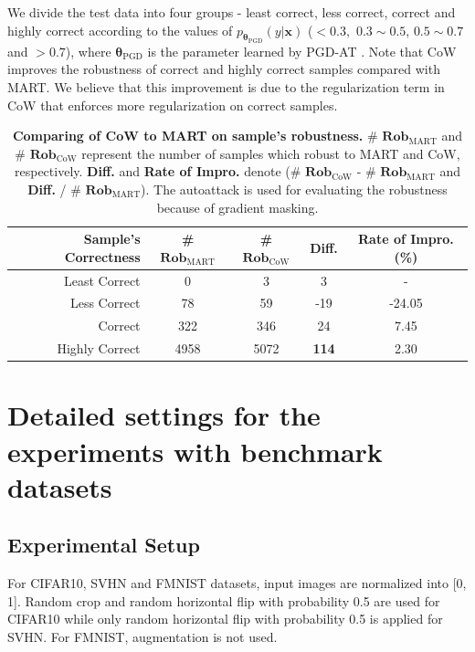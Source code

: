 \documentclass[nohyperref]{article}
\theoremstyle{plain}
\theoremstyle{definition}
\theoremstyle{remark}
\begin{document}
We divide the test data into four groups - least correct, less correct, correct and highly correct
according to the values of 
$p_{\bm{\theta}_{\text{PGD}}}(y|\bm{x})$ ($<0.3,$ $0.3 \sim 0.5$,  $0.5 \sim 0.7$ and $>0.7$), where $\bm{\theta}_{\text{PGD}}$ is the parameter learned by PGD-AT \citep{madry2018towards}.
Note that CoW improves the robustness of correct and highly correct samples compared with MART.
We believe that this improvement is due to the regularization term in CoW that enforces more regularization on correct samples.

 \begin{table}[ht]
    \caption{\textbf{Comparing of CoW to MART on sample's robustness.} \# $\textbf{Rob}_{\text{MART}}$ and \# $\textbf{Rob}_{\text{CoW}}$ represent the number of samples which robust to MART and CoW, respectively. \textbf{Diff.} and \textbf{Rate of Impro.} denote (\# $\textbf{Rob}_{\text{CoW}}$ - \# $\textbf{Rob}_{\text{MART}}$ and \textbf{Diff.} / \# $\textbf{Rob}_{\text{MART}}$). The autoattack is used for evaluating the robustness because of gradient masking.}
    \centering
    \begin{tabular}{r|cccc}
    \hline
    Sample's Correctness & \# $ \textbf{Rob}_{\text{MART}}$ & \# $\textbf{Rob}_{\text{CoW}}$ & \textbf{Diff.} & \textbf{Rate of Impro. (\%) } \\
    \hline
    \hline
    Least Correct       & 0 & 3 & 3 & - \\
    Less Correct        & 78 & 59 & -19 & -24.05 \\
    Correct             & 322 & 346 & 24 & 7.45 \\
    Highly Correct      & 4958 & 5072 & \textbf{114} & 2.30 \\
    \hline
    \end{tabular}
    \label{effect-regularization-cow-mart}
    \vskip -0.1in
\end{table}


\section{Detailed settings for the experiments with benchmark datasets}
\label{appB}

\subsection{Experimental Setup}
For CIFAR10, SVHN and FMNIST datasets, input images are normalized into [0, 1]. 
Random crop and random horizontal flip with probability 0.5 are used for CIFAR10 while only random horizontal flip with probability 0.5 is applied for SVHN.
For FMNIST, augmentation is not used.
\end{document}
